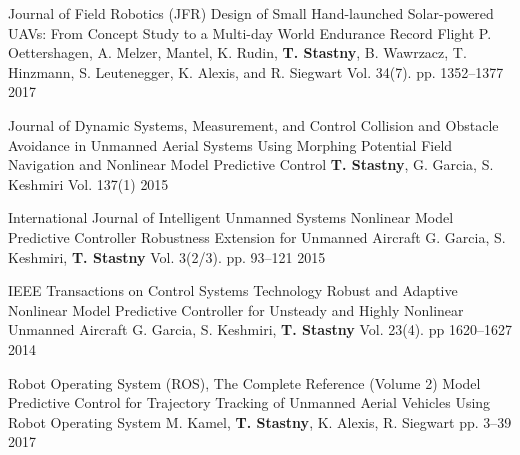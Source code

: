 \begin{cventries}
\cvpubentry
	{Journal of Field Robotics (JFR)} %
	{Design of Small Hand-launched Solar-powered UAVs: From Concept Study to a Multi-day World Endurance Record Flight} %
	{P. Oettershagen, A. Melzer, Mantel, K. Rudin, \textbf{T. Stastny}, B. Wawrzacz, T. Hinzmann, S. Leutenegger, K. Alexis, and R. Siegwart} %
	{Vol. 34(7). pp. 1352--1377} %
	{2017} %
	{} %
	{} %

\cvpubentry
	{Journal of Dynamic Systems, Measurement, and Control} %
	{Collision and Obstacle Avoidance in Unmanned Aerial Systems Using Morphing Potential Field Navigation and Nonlinear Model Predictive Control} %
	{\textbf{T. Stastny}, G. Garcia, S. Keshmiri} %
	{Vol. 137(1)} %
	{2015} %
	{} %
	{} %
	
\cvpubentry
	{International Journal of Intelligent Unmanned Systems} %
	{Nonlinear Model Predictive Controller Robustness Extension for Unmanned Aircraft} %
	{G. Garcia, S. Keshmiri, \textbf{T. Stastny}} %
	{Vol. 3(2/3). pp. 93--121} %
	{2015} %
	{} %
	{} %

\cvpubentry
	{IEEE Transactions on Control Systems Technology} %
	{Robust and Adaptive Nonlinear Model Predictive Controller for Unsteady and Highly Nonlinear Unmanned Aircraft} %
	{G. Garcia, S. Keshmiri, \textbf{T. Stastny}} %
	{Vol. 23(4). pp 1620--1627} %
	{2014} %
	{} %
	{} %

\clearpage
\begin{flushleft}
\end{flushleft}

\cvpubentry
	{Robot Operating System (ROS), The Complete Reference (Volume 2)} %
	{Model Predictive Control for Trajectory Tracking of Unmanned Aerial Vehicles Using Robot Operating System} %
	{M. Kamel, \textbf{T. Stastny}, K. Alexis, R. Siegwart} %
	{pp. 3--39} %
	{2017} %
	{} %
	{} %



\end{cventries}
